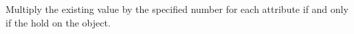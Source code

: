 Multiply the existing value by the specified number for each attribute if and
only if the  hold on the object.



